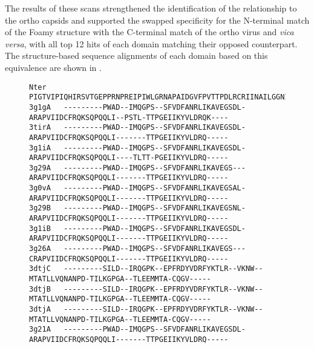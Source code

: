 The results of these scans strengthened the identification
of the relationship to the ortho capsids and supported the swapped specificity for the N-terminal
match of the Foamy structure with the C-terminal match of the ortho virus and {\em vica versa}, with all
top 12 hits of each domain matching their opposed counterpart.
The structure-based sequence alignments of each domain based on this equivalence are shown in .

\begin{figure}
\centering
\begin{singlespace}
\begin{tiny}
\begin{Verbatim}[frame=single]
Nter    PIGTVIPIQHIRSVTGEPPRNPREIPIWLGRNAPAIDGVFPVTTPDLRCRIINAILGGNIGLSLTPGDCLTWDSAVATLFIRTHGTFP
3g1gA   ---------PWAD--IMQGPS--SFVDFANRLIKAVEGSDL-ARAPVIIDCFRQKSQPQQLI--PSTL-TTPGEIIKYVLDRQK----
3tirA   ---------PWAD--IMQGPS--SFVDFANRLIKAVEGSDL-ARAPVIIDCFRQKSQPQQLI-------TTPGEIIKYVLDRQ-----
3g1iA   ---------PWAD--IMQGPS--SFVDFANRLIKAVEGSDL-ARAPVIIDCFRQKSQPQQLI----TLTT-PGEIIKYVLDRQ-----
3g29A   ---------PWAD--IMQGPS--SFVDFANRLIKAVEGS---ARAPVIIDCFRQKSQPQQLI-------TTPGEIIKYVLDRQ-----
3g0vA   ---------PWAD--IMQGPS--SFVDFANRLIKAVEGSAL-ARAPVIIDCFRQKSQPQQLI-------TTPGEIIKYVLDRQ-----
3g29B   ---------PWAD--IMQGPS--SFVDFANRLIKAVEGSNL-ARAPVIIDCFRQKSQPQQLI-------TTPGEIIKYVLDRQ-----
3g1iB   ---------PWAD--IMQGPS--SFVDFANRLIKAVEGSDL-ARAPVIIDCFRQKSQPQQLI-------TTPGEIIKYVLDRQ-----
3g26A   ---------PWAD--IMQGPS--SFVDFANRLIKAVEGS---CRAPVIIDCFRQKSQPQQLI-------TTPGEIIKYVLDRQ-----
3dtjC   ---------SILD--IRQGPK--EPFRDYVDRFYKTLR--VKNW--MTATLLVQNANPD-TILKGPGA--TLEEMMTA-CQGV-----
3dtjB   ---------SILD--IRQGPK--EPFRDYVDRFYKTLR--VKNW--MTATLLVQNANPD-TILKGPGA--TLEEMMTA-CQGV-----
3dtjA   ---------SILD--IRQGPK--EPFRDYVDRFYKTLR--VKNW--MTATLLVQNANPD-TILKGPGA--TLEEMMTA-CQGV-----
3g21A   ---------PWAD--IMQGPS--SFVDFANRLIKAVEGSDL-ARAPVIIDCFRQKSQPQQLI-------TTPGEIIKYVLDRQ-----


\end{Verbatim}
\end{tiny}
\end{singlespace}
\end{figure}
